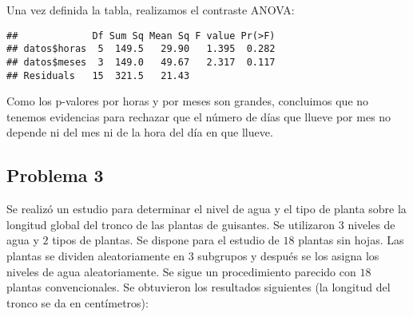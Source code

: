 \documentclass[
]{article}
\newenvironment{Shaded}{\begin{snugshade}}{\end{snugshade}}
\newcommand{\FunctionTok}[1]{\textcolor[rgb]{0.00,0.00,0.00}{#1}}
\newcommand{\NormalTok}[1]{#1}
\newcommand{\SpecialCharTok}[1]{\textcolor[rgb]{0.00,0.00,0.00}{#1}}
\begin{document}
Una vez definida la tabla, realizamos el contraste ANOVA:

\begin{Shaded}
\end{Shaded}

\begin{verbatim}
##             Df Sum Sq Mean Sq F value Pr(>F)
## datos$horas  5  149.5   29.90   1.395  0.282
## datos$meses  3  149.0   49.67   2.317  0.117
## Residuals   15  321.5   21.43
\end{verbatim}

Como los p-valores por horas y por meses son grandes, concluimos que no
tenemos evidencias para rechazar que el número de días que llueve por
mes no depende ni del mes ni de la hora del día en que llueve.

\hypertarget{problema-3}{%
\subsection{Problema 3}\label{problema-3}}

Se realizó un estudio para determinar el nivel de agua y el tipo de
planta sobre la longitud global del tronco de las plantas de guisantes.
Se utilizaron \(3\) niveles de agua y \(2\) tipos de plantas. Se dispone
para el estudio de \(18\) plantas sin hojas. Las plantas se dividen
aleatoriamente en \(3\) subgrupos y después se los asigna los niveles de
agua aleatoriamente. Se sigue un procedimiento parecido con \(18\)
plantas convencionales. Se obtuvieron los resultados siguientes (la
longitud del tronco se da en centímetros): ~\newline
\end{document}
